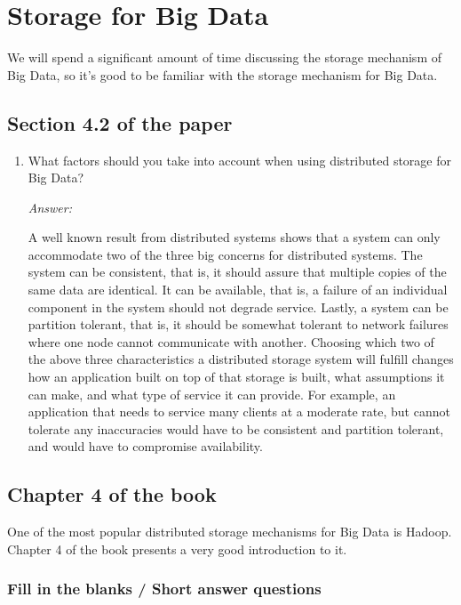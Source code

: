 \documentclass[11pt]{article}
\newcommand{\answer}{\vspace{0.25em}\par\textit{Answer:}\vspace{0.25em}\par}
\begin{document}
\section{Storage for Big Data}

We will spend a significant amount of time discussing the storage
mechanism of Big Data, so it's
good to be familiar with the storage mechanism for Big Data.

\subsection*{Section 4.2 of the paper}

\begin{enumerate}
  \item What factors should you take into account when using
    distributed storage for Big Data?
    \answer A well known result from distributed systems shows that a
    system can only accommodate two of the three big concerns for
    distributed systems. The system can be consistent, that is, it
    should assure that multiple copies of the same data are
    identical. It can be available, that is, a failure of an individual
    component in the system should not degrade service. Lastly, a
    system can be partition tolerant, that is, it should be somewhat
    tolerant to network failures where one node cannot communicate
    with another. Choosing which two of the above three
    characteristics a distributed storage system will fulfill
    changes how an application built on top of that storage is built,
    what assumptions it can make, and what type of service it can
    provide. For example, an application that needs to service many
    clients at a moderate rate, but cannot tolerate any inaccuracies
    would have to be consistent and partition tolerant, and would
    have to compromise availability.
\end{enumerate}

\subsection*{Chapter 4 of the book}

One of the most popular distributed storage mechanisms for Big Data
is Hadoop. Chapter 4 of the
book presents a very good introduction to it.

\subsubsection*{Fill in the blanks / Short answer questions}
\end{document}

